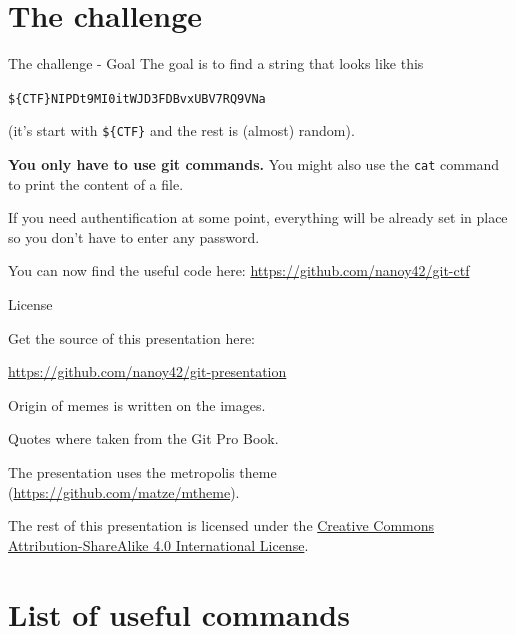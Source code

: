 \documentclass[10pt,aspectratio=169]{beamer}
\begin{document}
\section{The challenge}

\begin{frame}[fragile]{The challenge - Goal}
    The goal is to find a string that looks like this

    \begin{center}
        \verb|${CTF}NIPDt9MI0itWJD3FDBvxUBV7RQ9VNa|
    \end{center}
    (it's start with \verb|${CTF}| and the rest is (almost) random).

    \textbf{You only have to use git commands.} You might also use the \verb|cat| command to print the content of a file.

    If you need authentification at some point, everything will be already set in place so you don't have to enter any password.

    You can now find the useful code here: \url{https://github.com/nanoy42/git-ctf}
\end{frame}

\begin{frame}{License}

    Get the source of this presentation here:

    \begin{center}\url{https://github.com/nanoy42/git-presentation}\end{center}

    Origin of memes is written on the images.

    Quotes where taken from the Git Pro Book.

    The presentation uses the metropolis theme (\url{https://github.com/matze/mtheme}).

    The rest of this presentation is licensed under the
    \href{http://creativecommons.org/licenses/by-sa/4.0/}{Creative Commons
        Attribution-ShareAlike 4.0 International License}.

    \begin{center}\ccbysa\end{center}

\end{frame}

\section{List of useful commands}
\end{document}
